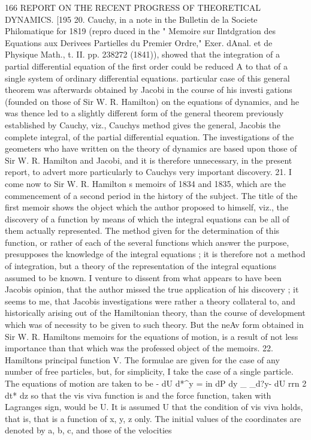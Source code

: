 \documentclass[12pt,a4paper]{article}
\theoremstyle{definition}
\begin{document}

166 REPORT ON THE RECENT PROGRESS OF THEORETICAL DYNAMICS.
[195
20. Cauchy, in a note in the Bulletin de la Societe Philomatique for 1819 (repro
duced in the " Memoire sur Ilntdgration des Equations aux Derivees Partielles du
Premier Ordre," Exer. dAnal. et de Physique Math., t. II. pp. 238272 (1841)), showed
that the integration of a partial differential equation of the first order could be reduced
A
to that of a single system of ordinary differential equations. particular case of
this general theorem was afterwards obtained by Jacobi in the course of his investi
gations (founded on those of Sir W. R. Hamilton) on the equations of dynamics, and
he was thence led to a slightly different form of the general theorem previously
established by Cauchy, viz., Cauchys method gives the general, Jacobis the complete
integral, of the partial differential equation. The investigations of the geometers who
have written on the theory of dynamics are based upon those of Sir W. R. Hamilton
and Jacobi, and it is therefore unnecessary, in the present report, to advert more
particularly to Cauchys very important discovery.
21. I come now to Sir W. R. Hamilton s memoirs of 1834 and 1835, which are
the commencement of a second period in the history of the subject. The title of the
first memoir shows the object which the author proposed to himself, viz., the discovery
of a function by means of which the integral equations can be all of them actually
represented. The method given for the determination of this function, or rather of
each of the several functions which answer the purpose, presupposes the knowledge of
the integral equations ; it is therefore not a method of integration, but a theory of
the representation of the integral equations assumed to be known. I venture to
dissent from what appears to have been Jacobis opinion, that the author missed the
true application of his discovery ; it seems to me, that Jacobis investigations were
rather a theory collateral to, and historically arising out of the Hamiltonian theory,
than the course of development which was of necessity to be given to such theory.
But the neAv form obtained in Sir W. R. Hamiltons memoirs for the equations of
motion, is a result of not less importance than that which was the professed object
of the memoirs.
22. Hamiltons principal function V. The formulae are given for the case of any
number of free particles, but, for simplicity, I take the case of a single particle. The
equations of motion are taken to be
-
dU
d*^y =
in
dP dy
_
_d?y- dU
rrn 2
dt* dz
so that the vis viva function is
and the force function, taken with Lagranges sign, would be U. It is assumed
U
that the condition of vis viva holds, that is, that is a function of x, y, z only.
The initial values of the coordinates are denoted by a, b, c, and those of the velocities
\end{document}
